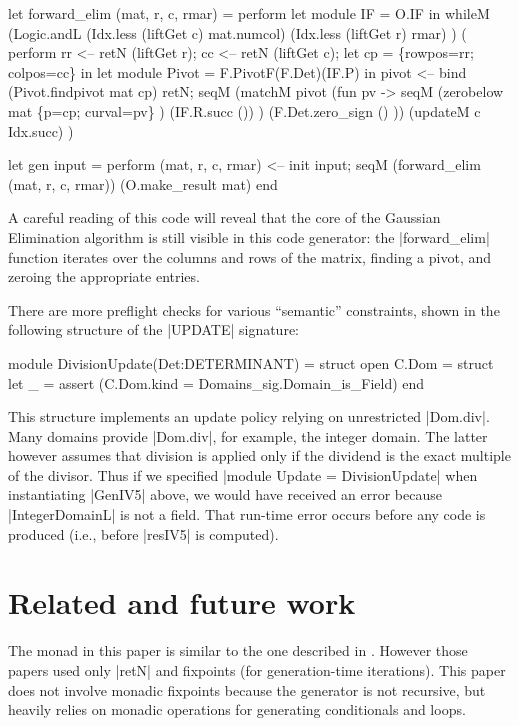 \documentclass{elsart}
\begin{document}
\begin{code2}
 let forward_elim (mat, r, c, rmar) = perform
    let module IF = O.IF in
      whileM (Logic.andL (Idx.less (liftGet c) mat.numcol)
                          (Idx.less (liftGet r) rmar) )
       ( perform
       rr <-- retN (liftGet r);
       cc <-- retN (liftGet c);
       let cp  = \{rowpos=rr; colpos=cc\} in
       let module Pivot = F.PivotF(F.Det)(IF.P) in
       pivot <-- bind (Pivot.findpivot mat cp) retN;
       seqM (matchM pivot (fun pv -> 
              seqM (zerobelow mat \{p=cp; curval=pv\} )
                   (IF.R.succ ()) )
              (F.Det.zero_sign () ))
            (updateM c Idx.succ) )

 let gen input = perform
    (mat, r, c, rmar) <-- init input;
    seqM 
      (forward_elim (mat, r, c, rmar))
      (O.make_result mat)
end
\end{code2}

A careful reading of this code will reveal that the core of the 
Gaussian Elimination algorithm is still visible in this code generator:
the |forward_elim| function iterates over the columns and rows of the
matrix, finding a pivot, and zeroing the appropriate entries.

There are more preflight checks for various ``semantic'' constraints, shown
in the following structure of the |UPDATE| signature:
\begin{code}
module DivisionUpdate(Det:DETERMINANT) =
  struct
  open C.Dom = struct 
  let _ = assert (C.Dom.kind = Domains_sig.Domain_is_Field)
end
\end{code}
%
This structure implements an update policy relying on
unrestricted |Dom.div|. Many domains provide |Dom.div|, for example,
the integer domain. The latter however assumes that division is applied
only if the dividend is the exact multiple of the divisor. Thus if we
specified |module Update = DivisionUpdate| when instantiating |GenIV5|
above, we would have received an error because |IntegerDomainL| is not
a field. That run-time error occurs before any code is produced (i.e.,
before |resIV5| is computed).

\section{Related and future work}\label{related}

The monad in this paper is similar to the one described in
\cite{SwadiMonadic06,KiselyovTaha}.  However those papers used only
|retN| and fixpoints (for generation-time iterations).  This paper
does not involve monadic fixpoints because the generator is not
recursive, but heavily relies on monadic operations for generating
conditionals and loops.
\end{document}
